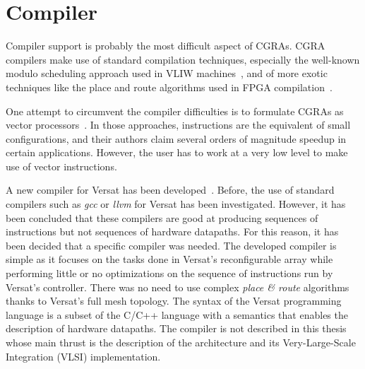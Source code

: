 \section{Compiler}
\label{section:compiler}

Compiler support is probably the most difficult aspect of CGRAs. CGRA
compilers make use of standard compilation techniques, especially the
well-known modulo scheduling approach used in VLIW
machines~\cite{Rau94}, and of more exotic techniques like the place
and route algorithms used in FPGA compilation~\cite{Betz99}.

One attempt to circumvent the compiler difficulties is to formulate
CGRAs as vector processors~\cite{Severance13,Severance14,Naylor14}. In
those approaches, instructions are the equivalent of small
configurations, and their authors claim several orders of magnitude
speedup in certain applications. However, the user has to work at a
very low level to make use of vector instructions. 

A new compiler for Versat has been
developed~\cite{Santiago2016}. Before, the use of standard compilers
such as {\em gcc} or {\em llvm} for Versat has been
investigated. However, it has been concluded that these compilers are
good at producing sequences of instructions but not sequences of
hardware datapaths. For this reason, it has been decided that a
specific compiler was needed. The developed compiler is simple as it
focuses on the tasks done in Versat's reconfigurable array while
performing little or no optimizations on the sequence of instructions
run by Versat's controller. There was no need to use complex {\em
  place \& route} algorithms thanks to Versat's full mesh
topology. The syntax of the Versat programming language is a subset of
the C/C++ language with a semantics that enables the description of
hardware datapaths. The compiler is not described in this thesis whose
main thrust is the description of the architecture and its
Very-Large-Scale Integration (VLSI) implementation.

